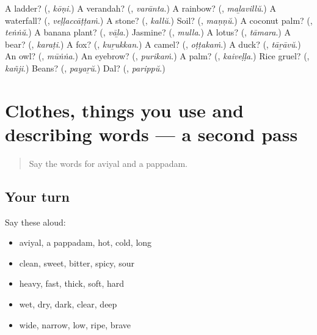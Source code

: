 \begin{tcolorbox}[breakable,colback=teal!4,colframe=teal!35!black,title={Before you move on}]
A ladder? (\textbf{}, \emph{kōṇi}.) A verandah? (\textbf{}, \emph{varānta}.) A rainbow? (\textbf{}, \emph{maḻavillŭ}.) A waterfall? (\textbf{}, \emph{veḷḷaccāṭṭaṁ}.) A stone? (\textbf{}, \emph{kallŭ}.) Soil? (\textbf{}, \emph{maṇṇŭ}.) A coconut palm? (\textbf{}, \emph{teṅṅŭ}.) A banana plant? (\textbf{}, \emph{vāḻa}.) Jasmine? (\textbf{}, \emph{mulla}.) A lotus? (\textbf{}, \emph{tāmara}.) A bear? (\textbf{}, \emph{karaṭi}.) A fox? (\textbf{}, \emph{kuṟukkan}.) A camel? (\textbf{}, \emph{oṭṭakaṁ}.) A duck? (\textbf{}, \emph{tāṟāvŭ}.) An owl? (\textbf{}, \emph{mūṅṅa}.) An eyebrow? (\textbf{}, \emph{purikaṁ}.) A palm? (\textbf{}, \emph{kaiveḷḷa}.) Rice gruel? (\textbf{}, \emph{kañji}.) Beans? (\textbf{}, \emph{payaṟŭ}.) Dal? (\textbf{}, \emph{parippŭ}.)
\end{tcolorbox}
\section[(dialogue)]{Clothes, things you use and describing words — a second pass}

\label{lesson:ML-R168-second-pass-clothes-things-you-use-and-describing-wo}



\begin{quote}
Say the words for aviyal and a pappadam.
\end{quote}

\subsection*{Your turn}
Say these aloud:

\begin{itemize}
\raggedright
  \item aviyal, a pappadam, hot, cold, long
  \item clean, sweet, bitter, spicy, sour
  \item heavy, fast, thick, soft, hard
  \item wet, dry, dark, clear, deep
  \item wide, narrow, low, ripe, brave
\end{itemize}

